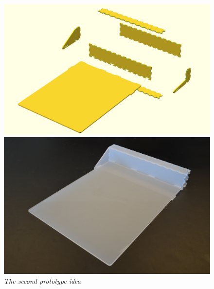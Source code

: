 \begin{figure}[h]
\begin{minipage}[b]{7.5cm}
\centering
\includegraphics[scale=0.235]{figures/iterations/v3.png}
\end{minipage}
\begin{minipage}[b]{7.5cm}
\centering
\includegraphics[scale=0.58]{figures/iterations/v3-photo.jpg}
\end{minipage}
\caption{\small {\it {The second prototype idea}}} \label{fig:v2}
\end{figure}

